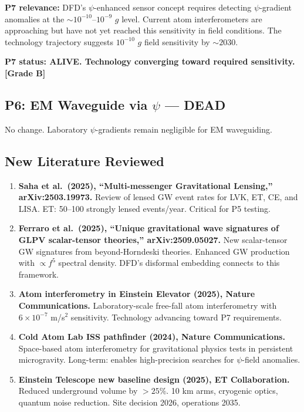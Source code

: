\documentclass[11pt]{article}
\newcommand{\ee}[1]{\times 10^{#1}}
\begin{document}
\textbf{P7 relevance:} DFD's $\psi$-enhanced sensor concept requires
detecting $\psi$-gradient anomalies at the $\sim 10^{-10}$--$10^{-9}$
$g$ level. Current atom interferometers are approaching but have not
yet reached this sensitivity in field conditions. The technology
trajectory suggests $10^{-10}$ $g$ field sensitivity by $\sim 2030$.

\textbf{P7 status: ALIVE. Technology converging toward required
sensitivity. [Grade B]}

\subsection{P6: EM Waveguide via $\psi$ --- DEAD}

No change. Laboratory $\psi$-gradients remain negligible for
EM waveguiding.

\subsection{New Literature Reviewed}

\begin{tcolorbox}[colback=green!5!white, colframe=green!50!black,
  title=\textbf{Agent 7: NEW LITERATURE REVIEWED}]

\begin{enumerate}

\item \textbf{Saha et al.\ (2025), ``Multi-messenger Gravitational
  Lensing,'' arXiv:2503.19973.}
  Review of lensed GW event rates for LVK, ET, CE, and LISA.
  ET: 50--100 strongly lensed events/year. Critical for P5 testing.

\item \textbf{Ferraro et al.\ (2025), ``Unique gravitational wave
  signatures of GLPV scalar-tensor theories,''
  arXiv:2509.05027.}
  New scalar-tensor GW signatures from beyond-Horndeski theories.
  Enhanced GW production with $\propto f^5$ spectral density.
  DFD's disformal embedding connects to this framework.

\item \textbf{Atom interferometry in Einstein Elevator (2025),
  Nature Communications.}
  Laboratory-scale free-fall atom interferometry with $6\ee{-7}$
  m/s$^2$ sensitivity. Technology advancing toward P7 requirements.

\item \textbf{Cold Atom Lab ISS pathfinder (2024), Nature
  Communications.}
  Space-based atom interferometry for gravitational physics tests
  in persistent microgravity. Long-term: enables high-precision
  searches for $\psi$-field anomalies.

\item \textbf{Einstein Telescope new baseline design (2025),
  ET Collaboration.}
  Reduced underground volume by $> 25\%$. 10 km arms, cryogenic optics,
  quantum noise reduction. Site decision 2026, operations 2035.

\end{enumerate}
\end{tcolorbox}
\end{document}
